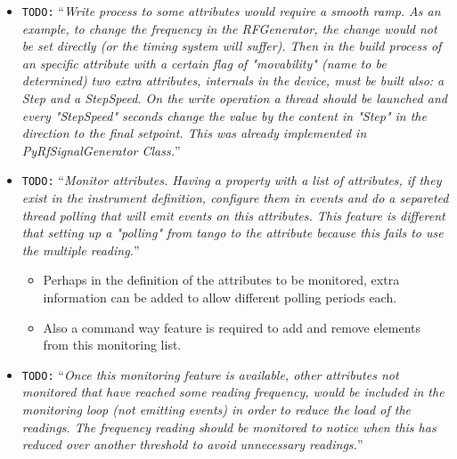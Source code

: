 \documentclass[a4paper,10pt]{article}
\newcommand{\todo}[1]{\texttt{\color{red}TODO:} ``\emph{#1}''}
\begin{document}
\begin{itemize}
    \item \todo{Write process to some attributes would require a smooth ramp. As an example, to change the frequency in the RFGenerator, the change would not be set directly (or the timing system will suffer). Then in the build process of an specific attribute with a certain flag of "movability" (name to be determined) two extra attributes, internals in the device, must be built also: a Step and a StepSpeed. On the write operation a thread should be launched and every "StepSpeed" seconds change the value by the content in "Step" in the direction to the final setpoint. This was already implemented in PyRfSignalGenerator Class.}
    \item \todo{Monitor attributes. Having a property with a list of attributes, if they exist in the instrument definition, configure them in events and do a separeted thread polling that will emit events on this attributes. This feature is different that setting up a "polling" from tango to the attribute because this fails to use the multiple reading.}
    \begin{itemize}
        \item Perhaps in the definition of the attributes to be monitored, extra information can be added to allow different polling periods each.
        \item Also a command way feature is required to add and remove elements from this monitoring list.
    \end{itemize}
    \item \todo{Once this monitoring feature is available, other attributes not monitored that have reached some reading frequency, would be included in the monitoring loop (not emitting events) in order to reduce the load of the readings. The frequency reading should be monitored to notice when this has reduced over another threshold to avoid unnecessary readings.}
\end{itemize}
\end{document}

